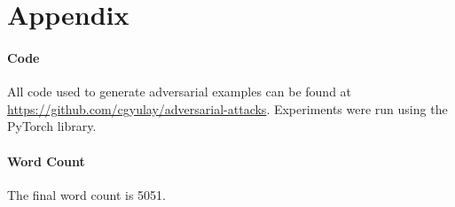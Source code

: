 \documentclass[]{article}
\begin{document}

\pagebreak

\nocite{*}




\pagebreak

\appendix
\section{Appendix}
\paragraph{Code} All code used to generate adversarial examples can be found at \url{https://github.com/cgyulay/adversarial-attacks}. Experiments were run using the PyTorch library.

\paragraph{Word Count} The final word count is 5051.
\end{document}
